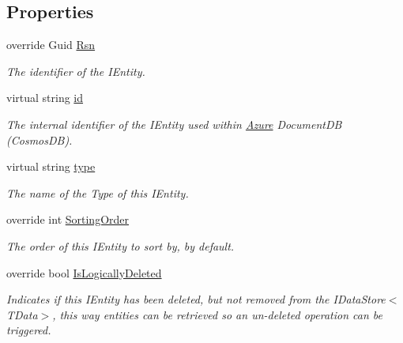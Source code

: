 \subsection*{Properties}
\begin{DoxyCompactItemize}
\item 
override Guid \hyperlink{classCqrs_1_1Azure_1_1DocumentDb_1_1Entities_1_1AzureDocumentDbEntity_a9f8073973963c42fc44bb5fba84cf70a_a9f8073973963c42fc44bb5fba84cf70a}{Rsn}
\begin{DoxyCompactList}\small\item\em The identifier of the I\+Entity. \end{DoxyCompactList}\item 
virtual string \hyperlink{classCqrs_1_1Azure_1_1DocumentDb_1_1Entities_1_1AzureDocumentDbEntity_a70118763769fc358c7206ef04f12ff6f_a70118763769fc358c7206ef04f12ff6f}{id}
\begin{DoxyCompactList}\small\item\em The internal identifier of the I\+Entity used within \hyperlink{namespaceCqrs_1_1Azure}{Azure} Document\+DB (Cosmos\+DB). \end{DoxyCompactList}\item 
virtual string \hyperlink{classCqrs_1_1Azure_1_1DocumentDb_1_1Entities_1_1AzureDocumentDbEntity_a4696c1d70da779b260ba76588aff80a7_a4696c1d70da779b260ba76588aff80a7}{type}
\begin{DoxyCompactList}\small\item\em The name of the Type of this I\+Entity. \end{DoxyCompactList}\item 
override int \hyperlink{classCqrs_1_1Azure_1_1DocumentDb_1_1Entities_1_1AzureDocumentDbEntity_a65addaa44fbb57497e730f4f806bc820_a65addaa44fbb57497e730f4f806bc820}{Sorting\+Order}
\begin{DoxyCompactList}\small\item\em The order of this I\+Entity to sort by, by default. \end{DoxyCompactList}\item 
override bool \hyperlink{classCqrs_1_1Azure_1_1DocumentDb_1_1Entities_1_1AzureDocumentDbEntity_ad3a216109e53eaa53aa1aa18eaea1f3a_ad3a216109e53eaa53aa1aa18eaea1f3a}{Is\+Logically\+Deleted}
\begin{DoxyCompactList}\small\item\em Indicates if this I\+Entity has been deleted, but not removed from the I\+Data\+Store$<$\+T\+Data$>$, this way entities can be retrieved so an un-\/deleted operation can be triggered. \end{DoxyCompactList}\end{DoxyCompactItemize}


